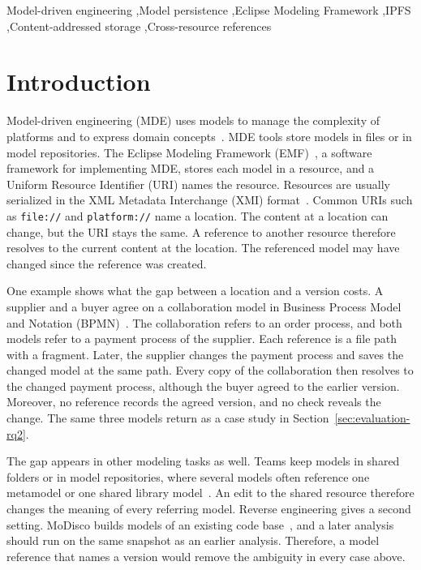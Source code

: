 \documentclass[5p,times,twocolumn]{elsarticle}
\theoremstyle{definition}
\theoremstyle{plain}
\begin{document}
\begin{frontmatter}
\begin{keyword}
Model-driven engineering \sep Model persistence \sep Eclipse Modeling Framework \sep IPFS \sep Content-addressed storage \sep Cross-resource references
\end{keyword}

\end{frontmatter}

\section{Introduction}\label{sec:introduction}

Model-driven engineering (MDE) uses models to manage the complexity of platforms and to express domain concepts~\cite{schmidt2006mde}. MDE tools store models in files or in model repositories. The Eclipse Modeling Framework (EMF)~\cite{steinberg2008emf}, a software framework for implementing MDE, stores each model in a resource, and a Uniform Resource Identifier (URI) names the resource. Resources are usually serialized in the XML Metadata Interchange (XMI) format~\cite{omg2015xmi}. Common URIs such as \texttt{file://} and \texttt{platform://} name a location. The content at a location can change, but the URI stays the same. A reference to another resource therefore resolves to the current content at the location. The referenced model may have changed since the reference was created.

One example shows what the gap between a location and a version costs. A supplier and a buyer agree on a collaboration model in Business Process Model and Notation (BPMN)~\cite{omg2010bpmn}. The collaboration refers to an order process, and both models refer to a payment process of the supplier. Each reference is a file path with a fragment. Later, the supplier changes the payment process and saves the changed model at the same path. Every copy of the collaboration then resolves to the changed payment process, although the buyer agreed to the earlier version. Moreover, no reference records the agreed version, and no check reveals the change. The same three models return as a case study in Section~\ref{sec:evaluation-rq2}.

The gap appears in other modeling tasks as well. Teams keep models in shared folders or in model repositories, where several models often reference one metamodel or one shared library model~\cite{dirocco2015repositories,franzago2018collaborative}. An edit to the shared resource therefore changes the meaning of every referring model. Reverse engineering gives a second setting. MoDisco builds models of an existing code base~\cite{bruneliere2010modisco,bruneliere2014modisco}, and a later analysis should run on the same snapshot as an earlier analysis. Therefore, a model reference that names a version would remove the ambiguity in every case above.
\end{document}
